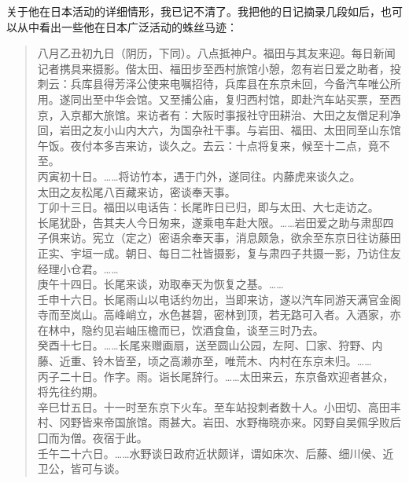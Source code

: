 关于他在日本活动的详细情形，我已记不清了。我把他的日记摘录几段如后，也可以从中看出一些他在日本广泛活动的蛛丝马迹：\\

\begin{quote}
	八月乙丑初九日（阴历，下同）。八点抵神户。福田与其友来迎。每日新闻记者携具来摄影。偕太田、福田步至西村旅馆小憩，忽有岩日爱之助者，投刺云：兵库县得芳泽公使来电嘱招待，兵库县在东京未回，今备汽车唯公所用。遂同出至中华会馆。又至捕公庙，复归西村馆，即赴汽车站买票，至西京，入京都大旅馆。来访者有：大阪时事报社守田耕治、大田之友僧足利净回，岩田之友小山内大六，为国杂社干事。与岩田、福田、太田同至山东馆午饭。夜付本多吉来访，谈久之。去云：十点将复来，候至十二点，竟不至。\\

丙寅初十日。……将访竹本，遇于门外，遂同往。内藤虎来谈久之。\\

太田之友松尾八百藏来访，密谈奉天事。\\

丁卯十三日。福田以电话告：长尾昨日已归，即与太田、大七走访之。\\

长尾犹卧，告其夫人今日匆来，遂乘电车赴大限。……岩田爱之助与肃邸四子俱来访。宪立（定之）密语余奉天事，消息颇急，欲余至东京日往访藤田正实、宇垣一成。朝日、每日二社皆摄影，复与肃四子共摄一影，乃访住友经理小仓君。……\\

庚午十四日。长尾来谈，劝取奉天为恢复之基。……\\

壬申十六日。长尾雨山以电话约勿出，当即来访，遂以汽车同游天满官金阁寺而至岚山。高峰峭立，水色甚碧，密林到顶，若无路可入者。入酒家，亦在林中，隐约见岩岫压檐而已，饮酒食鱼，谈至三时乃去。\\

癸酉十七日。……长尾来赠画扇，送至圆山公园，左阿、囗家、狩野、内藤、近重、铃木皆至，顷之高濑亦至，唯荒木、内村在东京未归。……\\

丙子二十日。作字。雨。诣长尾辞行。……太田来云，东京备欢迎者甚众，将先往约期。\\

辛巳廿五日。十一时至东京下火车。至车站投刺者数十人。小田切、高田丰村、冈野皆来帝国旅馆。雨甚大。岩田、水野梅晓亦来。冈野自吴佩孚败后囗而为僧。夜宿于此。\\

壬午二十六日。……水野谈日政府近状颇详，谓如床次、后藤、细川侯、近卫公，皆可与谈。\\


\end{quote}
